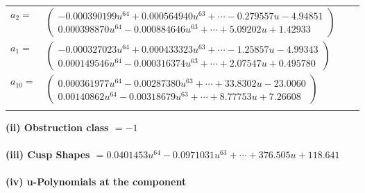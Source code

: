 \documentclass[1p]{elsarticle_modified}
\theoremstyle{definition}
\begin{document}
\begin{tabular}{m{7pt} m{180pt} m{7pt} m{180pt} }
\flushright $a_{2}=$&$\begin{pmatrix}-0.000390199 u^{64}+0.000564940 u^{63}+\cdots-0.279557 u-4.94851\\0.000398870 u^{64}-0.000884646 u^{63}+\cdots+5.09202 u+1.42933\end{pmatrix}$ \\
\flushright $a_{1}=$&$\begin{pmatrix}-0.000327023 u^{64}+0.000433323 u^{63}+\cdots-1.25857 u-4.99343\\0.000149546 u^{64}-0.000316374 u^{63}+\cdots+2.07547 u+0.495780\end{pmatrix}$ \\
\flushright $a_{10}=$&$\begin{pmatrix}0.000361977 u^{64}-0.00287380 u^{63}+\cdots+33.8302 u-23.0060\\0.00140862 u^{64}-0.00318679 u^{63}+\cdots+8.77753 u+7.26608\end{pmatrix}$\\&\end{tabular}
\flushleft \textbf{(ii) Obstruction class $= -1$}\\~\\
\flushleft \textbf{(iii) Cusp Shapes $= 0.0401453 u^{64}-0.0971031 u^{63}+\cdots+376.505 u+118.641$}\\~\\
\newpage\renewcommand{\arraystretch}{1}
\flushleft \textbf{(iv) u-Polynomials at the component}\newline \\
\end{document}
